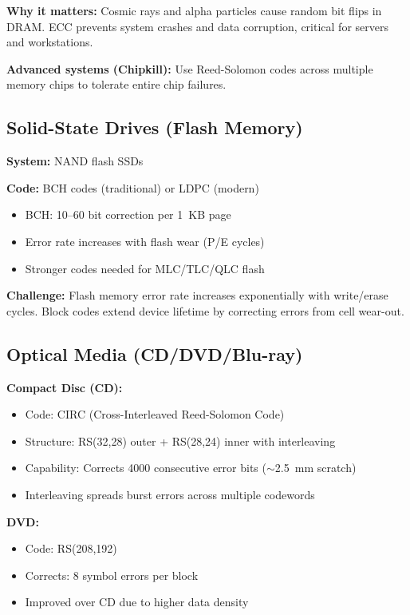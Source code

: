 \textbf{Why it matters:} Cosmic rays and alpha particles cause random bit flips in DRAM. ECC prevents system crashes and data corruption, critical for servers and workstations.

\textbf{Advanced systems (Chipkill):} Use Reed-Solomon codes across multiple memory chips to tolerate entire chip failures.

\subsection{Solid-State Drives (Flash Memory)}

\textbf{System:} NAND flash SSDs

\textbf{Code:} BCH codes (traditional) or LDPC (modern)
\begin{itemize}
\item BCH: 10--60 bit correction per 1~KB page
\item Error rate increases with flash wear (P/E cycles)
\item Stronger codes needed for MLC/TLC/QLC flash
\end{itemize}

\textbf{Challenge:} Flash memory error rate increases exponentially with write/erase cycles. Block codes extend device lifetime by correcting errors from cell wear-out.

\subsection{Optical Media (CD/DVD/Blu-ray)}

\textbf{Compact Disc (CD):}
\begin{itemize}
\item Code: CIRC (Cross-Interleaved Reed-Solomon Code)
\item Structure: RS(32,28) outer + RS(28,24) inner with interleaving
\item Capability: Corrects 4000 consecutive error bits ($\sim$2.5~mm scratch)
\item Interleaving spreads burst errors across multiple codewords
\end{itemize}

\textbf{DVD:}
\begin{itemize}
\item Code: RS(208,192)
\item Corrects: 8 symbol errors per block
\item Improved over CD due to higher data density
\end{itemize}

